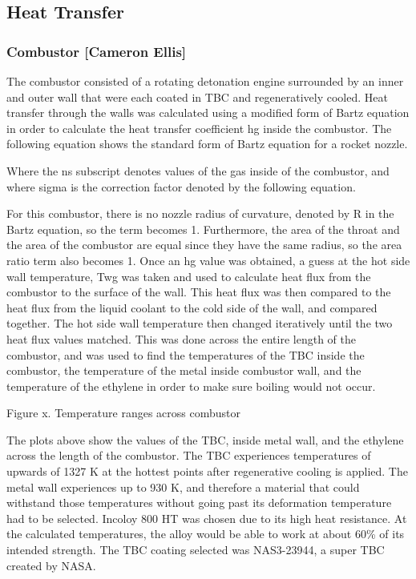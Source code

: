 \subsection{Heat Transfer}
\subsubsection{Combustor [Cameron Ellis]}

The combustor consisted of a rotating detonation engine surrounded by an inner and outer wall that were each coated in TBC and regeneratively cooled. Heat transfer through the walls was calculated using a modified form of Bartz equation in order to calculate the heat transfer coefficient hg inside the combustor. The following equation shows the standard form of Bartz equation for a rocket nozzle.

Where the ns subscript denotes values of the gas inside of the combustor, and where sigma is the correction factor denoted by the following equation.

For this combustor, there is no nozzle radius of curvature, denoted by R in the Bartz equation, so the term  becomes 1. Furthermore, the area of the throat and the area of the combustor are equal since they have the same radius, so the area ratio term  also becomes 1. Once an hg value was obtained, a guess at the hot side wall temperature, Twg was taken and used to calculate heat flux from the combustor to the surface of the wall. This heat flux was then compared to the heat flux from the liquid coolant to the cold side of the wall, and compared together. The hot side wall temperature then changed iteratively until the two heat flux values matched. This was done across the entire length of the combustor, and was used to find the temperatures of the TBC inside the combustor, the temperature of the metal inside combustor wall, and the temperature of the ethylene in order to make sure boiling would not occur.

Figure x. Temperature ranges across combustor

The plots above show the values of the TBC, inside metal wall, and the ethylene across the length of the combustor. The TBC experiences temperatures of upwards of 1327 K at the hottest points after regenerative cooling is applied. The metal wall experiences up to 930 K, and therefore a material that could withstand those temperatures without going past its deformation temperature had to be selected. Incoloy 800 HT was chosen due to its high heat resistance. At the calculated temperatures, the alloy would be able to work at about 60\% of its intended strength. The TBC coating selected was NAS3-23944, a super TBC created by NASA.

